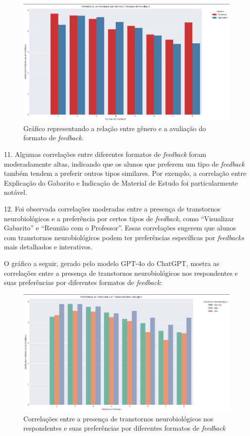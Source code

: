 \begin{figure}[H]
\centering
\caption{Gráfico representando a relação entre gênero e a avaliação do formato de \textit{feedback}.}
\includegraphics[scale=0.5]{figuras/gender.png}
\end{figure}

11. Algumas correlações entre diferentes formatos de \textit{feedback} foram moderadamente altas, indicando que os alunos que preferem um tipo de \textit{feedback} também tendem a preferir outros tipos similares. Por exemplo, a correlação entre Explicação do Gabarito e Indicação de Material de Estudo foi particularmente notável.

12. Foi observada correlações moderadas entre a presença de transtornos neurobiológicos e a preferência por certos tipos de \textit{feedback}, como ``Visualizar Gabarito'' e ``Reunião com o Professor''. Essas correlações sugerem que alunos com transtornos neurobiológicos podem ter preferências específicas por \textit{feedbacks} mais detalhados e interativos.

O gráfico a seguir, gerado pelo modelo GPT-4o do ChatGPT, mostra as correlações entre a presença de transtornos neurobiológicos nos respondentes e suas preferências por diferentes formatos de \textit{feedback}:

\begin{figure}[!h]
\centering
\caption{Correlações entre a presença de transtornos neurobiológicos nos respondentes e suas preferências por diferentes formatos de \textit{feedback}}
\includegraphics[scale=0.5]{figuras/neurological.png}
\end{figure}

